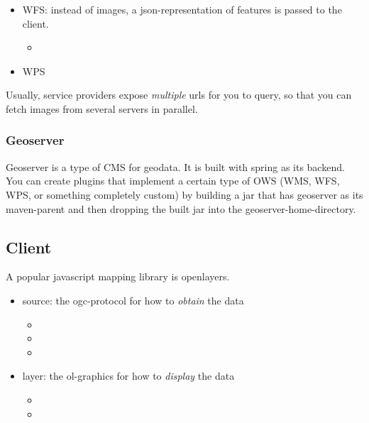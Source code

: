 \begin{itemize}
    \item WFS: instead of images, a json-representation of features is passed to the client. 
        \begin{itemize}
            \item 
        \end{itemize}

    \item WPS
\end{itemize}

Usually, service providers expose \emph{multiple} urls for you to query, so that you can fetch images from several servers in parallel. 

\subsubsection{Geoserver}

Geoserver is a type of CMS for geodata. It is built with spring as its backend. 
You can create plugins that implement a certain type of OWS (WMS, WFS, WPS, or something completely custom) by building a jar that has geoserver as its maven-parent and then dropping the built jar into the geoserver-home-directory.



\subsection{Client}

A popular javascript mapping library is openlayers. 

\begin{itemize}
    \item source: the ogc-protocol for how to \emph{obtain} the data
        \begin{itemize}
            \item {}
            \item {}
            \item {}
        \end{itemize}
    \item layer: the ol-graphics for how to \emph{display} the data
        \begin{itemize}
            \item {}
            \item {}
        \end{itemize}
\end{itemize}




